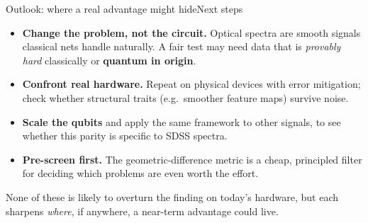 \begin{frame}{Outlook: where a real advantage might hide}{Next steps}
    \begin{itemize}
        \item \textbf{Change the problem, not the circuit.} Optical spectra are smooth
              signals classical nets handle naturally. A fair test may need data that
              is \emph{provably hard} classically or \textbf{quantum in origin}.
        \item \textbf{Confront real hardware.} Repeat on physical devices with error
              mitigation; check whether structural traits (e.g.\ smoother feature maps)
              survive noise.
        \item \textbf{Scale the qubits} and apply the same framework to other signals,
              to see whether this parity is specific to SDSS spectra.
        \item \textbf{Pre-screen first.} The geometric-difference metric is a cheap,
              principled filter for deciding which problems are even worth the effort.
    \end{itemize}
    \begin{callout}
        None of these is likely to overturn the finding on today's hardware, but
        each sharpens \emph{where}, if anywhere, a near-term advantage could live.
    \end{callout}
\end{frame}
